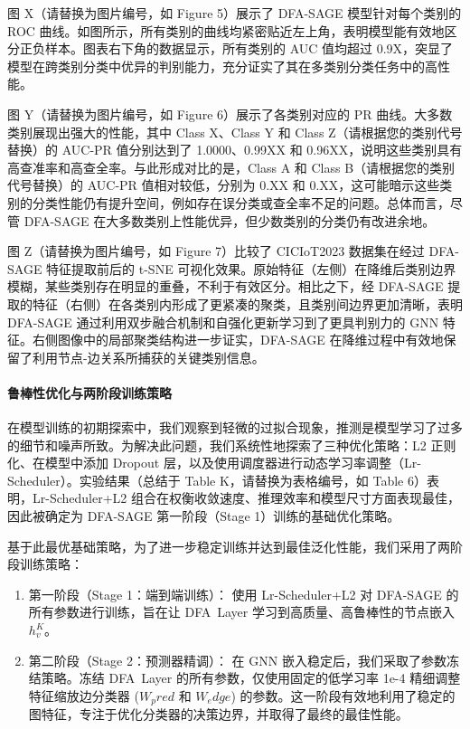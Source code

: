 \documentclass{article}
\begin{document}
图 X（请替换为图片编号，如 Figure 5）展示了 DFA-SAGE 模型针对每个类别的 ROC
曲线。如图所示，所有类别的曲线均紧密贴近左上角，表明模型能有效地区分正负样本。图表右下角的数据显示，所有类别的 AUC 值均超过
0.9X，突显了模型在跨类别分类中优异的判别能力，充分证实了其在多类别分类任务中的高性能。

图 Y（请替换为图片编号，如 Figure 6）展示了各类别对应的 PR 曲线。大多数类别展现出强大的性能，其中 Class
X、Class Y 和 Class Z（请根据您的类别代号替换）的 AUC-PR 值分别达到了 1.0000、0.99XX 和
0.96XX，说明这些类别具有高查准率和高查全率。与此形成对比的是，Class A 和 Class B（请根据您的类别代号替换）的
AUC-PR 值相对较低，分别为 0.XX 和
0.XX，这可能暗示这些类别的分类性能仍有提升空间，例如存在误分类或查全率不足的问题。总体而言，尽管 DFA-SAGE
在大多数类别上性能优异，但少数类别的分类仍有改进余地。

图 Z（请替换为图片编号，如 Figure 7）比较了 CICIoT2023 数据集在经过 DFA-SAGE 特征提取前后的 t-SNE
可视化效果。原始特征（左侧）在降维后类别边界模糊，某些类别存在明显的重叠，不利于有效区分。相比之下，经 DFA-SAGE
提取的特征（右侧）在各类别内形成了更紧凑的聚类，且类别间边界更加清晰，表明 DFA-SAGE
通过利用双步融合机制和自强化更新学习到了更具判别力的 GNN 特征。右侧图像中的局部聚类结构进一步证实，DFA-SAGE
在降维过程中有效地保留了利用节点-边关系所捕获的关键类别信息。

\paragraph{鲁棒性优化与两阶段训练策略}

在模型训练的初期探索中，我们观察到轻微的过拟合现象，推测是模型学习了过多的细节和噪声所致。为解决此问题，我们系统性地探索了三种优化策略：L2
正则化、在模型中添加 Dropout 层，以及使用调度器进行动态学习率调整（Lr-Scheduler）。实验结果（总结于 Table
K，请替换为表格编号，如 Table 6）表明，Lr-Scheduler+L2
组合在权衡收敛速度、推理效率和模型尺寸方面表现最佳，因此被确定为 DFA-SAGE 第一阶段（Stage 1）训练的基础优化策略。

基于此最优基础策略，为了进一步稳定训练并达到最佳泛化性能，我们采用了两阶段训练策略：

\begin{enumerate}
  \item 第一阶段（Stage 1：端到端训练）： 使用 Lr-Scheduler+L2 对 DFA-SAGE
    的所有参数进行训练，旨在让 DFA Layer 学习到高质量、高鲁棒性的节点嵌入$ h_v^K $。
  \item 第二阶段（Stage 2：预测器精调）： 在 GNN 嵌入稳定后，我们采取了参数冻结策略。冻结 DFA Layer
    的所有参数，仅使用固定的低学习率 1e-4 精细调整特征缩放边分类器 ($W_pred$ 和 $W_edge$)
    的参数。这一阶段有效地利用了稳定的图特征，专注于优化分类器的决策边界，并取得了最终的最佳性能。
\end{enumerate}
\end{document}
